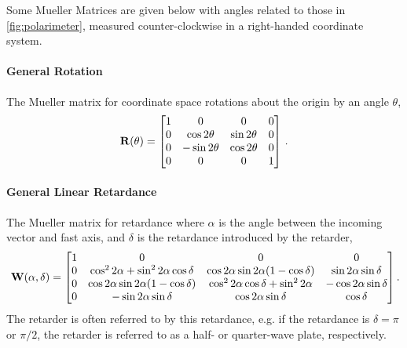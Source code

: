 Some Mueller Matrices are given below with angles related to those in \autoref{fig:polarimeter}, measured counter-clockwise in a right-handed coordinate system.

\paragraph{General Rotation}
The Mueller matrix for coordinate space rotations about the origin by an angle $\theta$,
\begin{equation} \label{matrix:rotate}
    \mathbf{R}(\theta) =
    \begin{bmatrix}
        1 & 0              & 0             & 0 \\
        0 & \cos 2 \theta  & \sin 2 \theta & 0 \\
        0 & -\sin 2 \theta & \cos 2 \theta & 0 \\
        0 & 0              & 0             & 1 \\
    \end{bmatrix}\,.
\end{equation}

\pagebreak

\paragraph{General Linear Retardance}
The Mueller matrix for retardance where $\alpha$ is the angle between the incoming vector and fast axis, and $\delta$ is the retardance introduced by the retarder,
\begin{equation} \label{matrix:retarder}
    \matr{W}(\alpha, \delta) =
    \begin{bmatrix}
        1 & 0                                                 & 0                                                 & 0                          \\
        0 & \cos^{2} 2 \alpha + \sin^{2} 2 \alpha \cos \delta & \cos 2 \alpha \sin 2 \alpha  (1 - \cos \delta)    & \sin 2 \alpha \sin \delta  \\
        0 & \cos 2 \alpha \sin 2 \alpha  (1 - \cos \delta)    & \cos^{2} 2 \alpha \cos \delta + \sin^{2} 2 \alpha & -\cos 2 \alpha \sin \delta \\
        0 & -\sin 2 \alpha \sin \delta                        & \cos 2 \alpha \sin \delta                         & \cos \delta                \\
    \end{bmatrix}\rlap{.} 
\end{equation}
The retarder is often referred to by this retardance, e.g. if the retardance is $\delta = \pi$ or $\pi / 2$, the retarder is referred to as a half- or quarter-wave plate, respectively.

